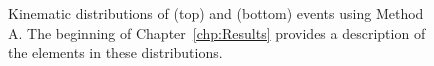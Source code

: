 \begin{figure}[h!]
\caption{Kinematic distributions of \phoonejet (top) and \photwojet (bottom) events using Method A. The beginning of Chapter~\ref{chp:Results} provides a description of the elements in these distributions.}
\label{fig:pjSetTwo}
\end{figure}
\clearpage

